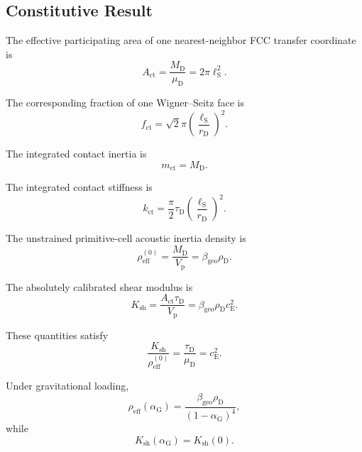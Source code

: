 \subsection{Constitutive Result}

The effective participating area of one nearest-neighbor FCC transfer coordinate is
\begin{equation}
    \boxed{ A_{\mathrm{ct}} = \frac{M_{\mathrm{D}}}{\mu_{\mathrm{D}}} = 2\pi\ell_{\mathrm{S}}^2 }.
\end{equation}

The corresponding fraction of one Wigner--Seitz face is
\begin{equation}
    \boxed{ f_{\mathrm{ct}} = \sqrt{2}\pi \left( \frac{\ell_{\mathrm{S}}}{r_{\mathrm{D}}} \right)^2 }.
\end{equation}

The integrated contact inertia is
\begin{equation}
    \boxed{ m_{\mathrm{ct}} = M_{\mathrm{D}} }.
\end{equation}

The integrated contact stiffness is
\begin{equation}
    \boxed{ k_{\mathrm{ct}} = \frac{\pi}{2} \tau_{\mathrm{D}} \left( \frac{\ell_{\mathrm{S}}}{r_{\mathrm{D}}} \right)^2 }.
\end{equation}

The unstrained primitive-cell acoustic inertia density is
\begin{equation}
    \boxed{ \rho_{\mathrm{eff}}^{(0)} = \frac{M_{\mathrm{D}}}{V_{\mathrm{p}}} = \beta_{\mathrm{geo}}\rho_{\mathrm{D}} }.
\end{equation}

The absolutely calibrated shear modulus is
\begin{equation}
    \boxed{ K_{\mathrm{sh}} = \frac{ A_{\mathrm{ct}}\tau_{\mathrm{D}} }{ V_{\mathrm{p}} } = \beta_{\mathrm{geo}} \rho_{\mathrm{D}} c_{\mathrm{E}}^2 }.
\end{equation}

These quantities satisfy
\begin{equation}
    \boxed{ \frac{K_{\mathrm{sh}}}{\rho_{\mathrm{eff}}^{(0)}} = \frac{\tau_{\mathrm{D}}}{\mu_{\mathrm{D}}} = c_{\mathrm{E}}^2 }.
\end{equation}

Under gravitational loading,
\begin{equation}
    \boxed{ \rho_{\mathrm{eff}} \left( \alpha_{\mathrm{G}} \right) = \frac{ \beta_{\mathrm{geo}}\rho_{\mathrm{D}} }{ \left( 1-\alpha_{\mathrm{G}} \right)^4 } },
\end{equation}
while
\begin{equation}
    \boxed{ K_{\mathrm{sh}} \left( \alpha_{\mathrm{G}} \right) = K_{\mathrm{sh}}(0) }.
\end{equation}

